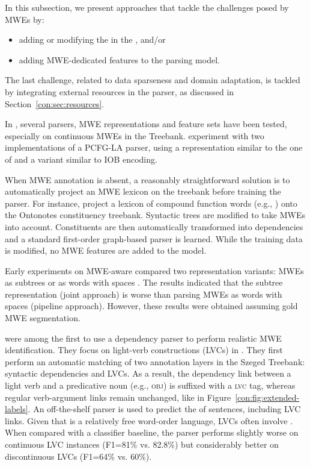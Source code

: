 \documentclass[output=paper]{langsci/langscibook}
\begin{document}
In this subsection, we present approaches that tackle the challenges posed by MWEs by:
\begin{itemize}
 \item adding or modifying the  in the , and/or
 \item adding MWE-dedicated features to the parsing model.
\end{itemize}
The last challenge, related to data sparseness and domain adaptation, is tackled by integrating external resources in the parser, as discussed in Section~\ref{con:sec:resources}.


In , several parsers, MWE representations and feature sets have been tested, especially on continuous MWEs in the  Treebank. 
\citet{constant13combining} experiment with two implementations of a PCFG-LA parser, using a representation similar to the one of \citet{green11} and a variant similar to IOB encoding.

When MWE annotation is absent, a reasonably straightforward solution is to automatically project an MWE lexicon on the treebank before training the parser.
For instance, \citet{kato16} project a lexicon of compound function words (e.g., ) onto the  Ontonotes constituency treebank. 
Syntactic trees are modified to take MWEs into account.
Constituents are then automatically transformed into dependencies and a standard first-order graph-based parser is learned.
While the training data is modified, no MWE features are added to the model.

Early experiments on MWE-aware  compared two representation variants: MWEs as subtrees or as words with spaces \citep{nivre04b}.
The results indicated that the subtree representation (joint approach) is worse than parsing MWEs as words with spaces (pipeline approach).
However, these results were obtained assuming gold MWE segmentation. %

\citet{vincze13} were among the first to use a dependency parser to perform realistic MWE identification.
They focus on light-verb constructions (LVCs) in .
They first perform an automatic matching of two annotation layers in the Szeged Treebank: syntactic dependencies and LVCs.
As a result, the  dependency link between a light verb and a predicative noun (e.g., {\scshape obj}) is suffixed with a {\scshape lvc} tag, whereas regular verb-argument links remain unchanged, like in Figure~\ref{con:fig:extended-labels}. An off-the-shelf parser is used to predict the  of sentences, including LVC links.
Given that  is a relatively free word-order language, LVCs often involve .
When compared with a classifier baseline, the parser performs slightly worse on continuous LVC instances (F1=81\% vs. 82.8\%) but considerably better on discontinuous LVCs (F1=64\% vs. 60\%).
\end{document}

